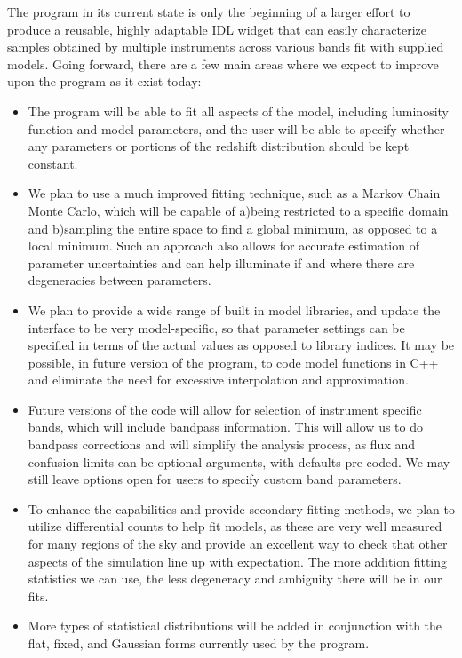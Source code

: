 \documentclass[twocolumn,letterpaper,10pt]{article}
\begin{document}
The program in its current state is only the beginning of a larger effort to produce a reusable, highly adaptable IDL widget that can easily characterize samples obtained by multiple instruments across various bands fit with supplied models. Going forward, there are a few main areas where we expect to improve upon the program as it exist today:
\begin{itemize} \itemsep0pt \parskip0pt 
\item The program will be able to fit all aspects of the model, including luminosity function and model parameters, and the user will be able to specify whether any parameters or portions of the redshift distribution should be kept constant.
\item We plan to use a much improved fitting technique, such as a Markov Chain Monte Carlo, which will be capable of a)being restricted to a specific domain and b)sampling the entire space to find a global minimum, as opposed to a local minimum. Such an approach also allows for accurate estimation of parameter uncertainties and can help illuminate if and where there are degeneracies between parameters.
\item We plan to provide a wide range of built in model libraries, and update the interface to be very model-specific, so that parameter settings can be specified in terms of the actual values as opposed to library indices. It may be possible, in future version of the program, to code model functions in C++ and eliminate the need for excessive interpolation and approximation.
\item Future versions of the code will allow for selection of instrument specific bands, which will include bandpass information. This will allow us to do bandpass corrections and will simplify the analysis process, as flux and confusion limits can be optional arguments, with defaults pre-coded. We may still leave options open for users to specify custom band parameters.
\item To enhance the capabilities and provide secondary fitting methods, we plan to utilize differential counts to help fit models, as these are very well measured for many regions of the sky and provide an excellent way to check that other aspects of the simulation line up with expectation. The more addition fitting statistics we can use, the less degeneracy and ambiguity there will be in our fits.
\item More types of statistical distributions will be added in conjunction with the flat, fixed, and Gaussian forms currently used by the program.
\end{itemize}
\end{document}
